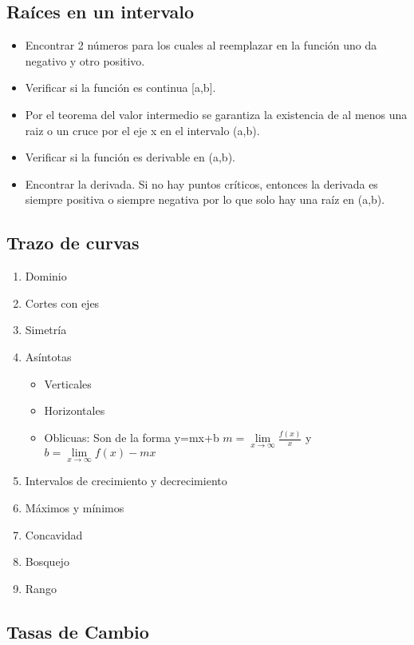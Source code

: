\begin{itemize}
	\subsection{Raíces en un intervalo}
	\begin{itemize}
		\item Encontrar 2 números para los cuales al reemplazar en la función uno da negativo y otro positivo. 
		\item Verificar si la función es continua [a,b].
		\item Por el teorema del valor intermedio se garantiza la existencia de al menos una raiz o un cruce por el eje x en el intervalo (a,b).
		\item Verificar si la función es derivable en (a,b).
		\item Encontrar la derivada. Si no hay puntos críticos, entonces la derivada es siempre positiva o siempre negativa por lo que solo hay una raíz en (a,b).
	\end{itemize}
\end{itemize}

\subsection{Trazo de curvas}
\begin{enumerate}
	\item Dominio
	\item Cortes con ejes
	\item Simetría
	\item Asíntotas
	\begin{itemize}
		\item Verticales
		\item Horizontales
		\item Oblicuas: Son de la forma y=mx+b
		$m=\lim\limits_{x \to \infty}\frac{f(x)}{x}$ y $b=\lim\limits_{x \to \infty}f(x)-mx$
	\end{itemize}
	\item Intervalos de crecimiento y decrecimiento
	\item Máximos y mínimos
	\item Concavidad
	\item Bosquejo
	\item Rango
\end{enumerate}

\subsection{Tasas de Cambio}

